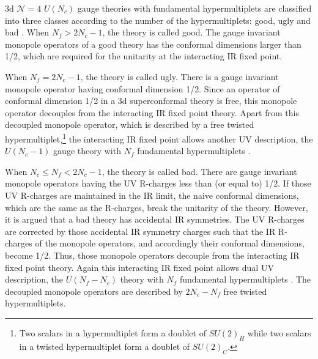 \documentclass[a4paper,11pt]{article}
\begin{document}
3d $\mathcal N = 4$ $U(N_c)$ gauge theories with fundamental hypermultiplets are classified into three classes according to the number of the hypermultiplets: good, ugly and bad \cite{Gaiotto:2008ak,Kapustin:2010mh}. When $N_f > 2 N_c-1$, the theory is called good. The gauge invariant monopole operators of a good theory has the conformal dimensions larger than 1/2, which are required for the unitarity at the interacting IR fixed point.

When $N_f = 2 N_c-1$, the theory is called ugly. There is a gauge invariant monopole operator having conformal dimension 1/2. Since an operator of conformal dimension 1/2 in a 3d superconformal theory is free, this monopole operator decouples from the interacting IR fixed point theory. Apart from this decoupled monopole operator, which is described by a free twisted hypermultiplet,\footnote{Two scalars in a hypermultiplet form a doublet of $SU(2)_H$ while two scalars in a twisted hypermultiplet form a doublet of $SU(2)_C$.} the interacting IR fixed point allows another UV description, the $U(N_c-1)$ gauge theory with $N_f$ fundamental hypermultiplets \cite{Gaiotto:2008ak,Kapustin:2010mh}.

When $N_c \leq N_f < 2 N_c-1$, the theory is called bad. There are gauge invariant monopole operators having the UV R-charges less than (or equal to) 1/2. If those UV R-charges are maintained in the IR limit, the naive conformal dimensions, which are the same as the R-charges, break the unitarity of the theory. However, it is argued that a bad theory has accidental IR symmetries. The UV R-charges are corrected by those accidental IR symmetry charges such that the IR R-charges of the monopole operators, and accordingly their conformal dimensions, become 1/2. Thus, those monopole operators decouple from the interacting IR fixed point theory. Again this interacting IR fixed point allows dual UV description, the $U(N_f-N_c)$ theory with $N_f$ fundamental hypermultiplets \cite{Kim:2012uz,Yaakov:2013fza,Gaiotto:2013bwa}. The decoupled monopole operators are described by $2 N_c-N_f$ free twisted hypermultiplets.
\end{document}
